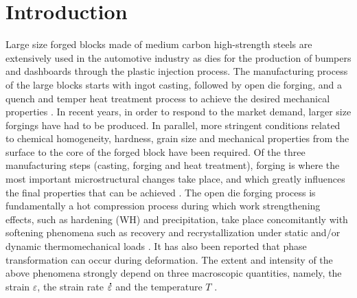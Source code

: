 \documentclass[twoside,english,1p,final,sort&compress]{elsarticle}
\theoremstyle{plain}
\DeclareRobustCommand{\mdot}[1]{\accentset{\mbox{\bfseries .}}{#1}}
\begin{document}
\section{Introduction\label{sec:Introduction}}
Large size forged blocks made of medium carbon high-strength steels are extensively used in the automotive industry as dies for the production of bumpers and dashboards through the plastic injection process.
The manufacturing process of the large blocks starts with ingot casting, followed by open die forging, and a quench and temper heat treatment process to achieve the desired mechanical properties \cite{chadha2017deformation, chadha2018influence, murugesan2019two}.
In recent years, in order to respond to the market demand, larger size forgings have had to be produced.
In parallel, more stringent conditions related to chemical homogeneity, hardness, grain size and mechanical properties from the surface to the core of the forged block have been required.
Of the three manufacturing steps (casting, forging and heat treatment), forging is where the most important microstructural changes take place, and which greatly influences the final properties that can be achieved \cite{murugesan2019hybrid, chadha2020microstructure, sripada2022effect}.
The open die forging process is fundamentally a hot compression process during which work strengthening effects, such as hardening (WH) and precipitation, take place concomitantly with softening phenomena such as recovery and recrystallization under static and/or dynamic thermomechanical loads \cite{tian2022deformation, tavakoli2019ferrite}.
It has also been reported that phase transformation can occur during deformation.
The extent and intensity of the above phenomena strongly depend on three macroscopic quantities, namely, the strain $\varepsilon$, the strain rate $\mdot\varepsilon$ and the temperature $T$ \cite{ebrahimi2017flow, Ashtiani-2012, He-2013, Changizian-2012}.
\end{document}
